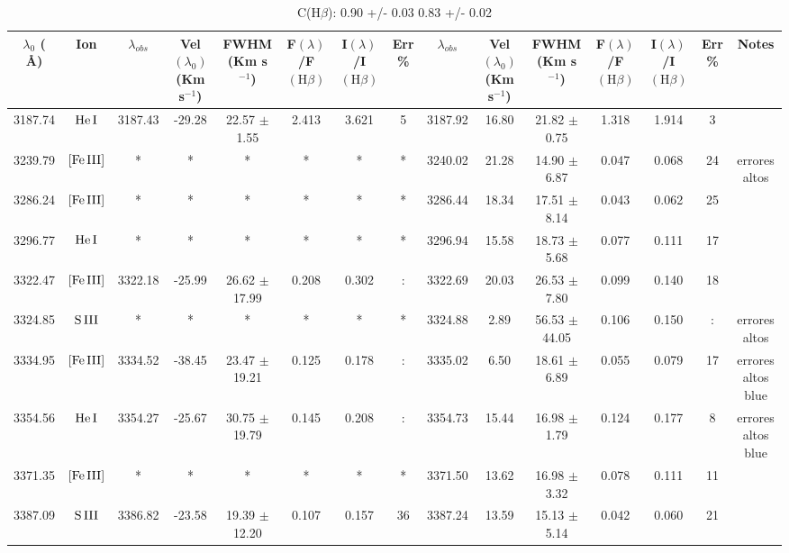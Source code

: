 \documentclass{article}
\begin{document}
\begin{table*}
\caption{C(H$\beta$): 0.90 +/- 0.03 0.83 +/- 0.02 } 
\begin{adjustbox}{width=\textwidth}
\label{}
\begin{tabular}{ccccccccccccccc} 
\hline
$\lambda_0$ ( \AA ) & Ion & $\lambda_{obs}$ & Vel$\left( \lambda_0 \right)$ (Km s$^{-1}$) & FWHM (Km s$^{-1}$) & F$\left( \lambda \right)$/F$\left( \mbox{H}\beta \right)$ & I$\left( \lambda \right)$/I$\left( \mbox{H}\beta \right)$ & Err \% & $\lambda_{obs}$ & Vel$\left( \lambda_0 \right)$ (Km s$^{-1}$) & FWHM (Km s$^{-1}$) & F$\left( \lambda \right)$/F$\left( \mbox{H}\beta \right)$ & I$\left( \lambda \right)$/I$\left( \mbox{H}\beta \right)$ & Err \% & Notes \\
\hline
3187.74 & $\mbox{He}\thinspace \mbox{I}$ & 3187.43 & -29.28 & 22.57 $\pm$ 1.55 & 2.413 & 3.621 & 5 & 3187.92 & 16.80 & 21.82 $\pm$ 0.75 & 1.318 & 1.914 & 3 &  \\
3239.79 & $\mbox{[Fe}\thinspace \mbox{III]}$ & * & * & * & * & * & * & 3240.02 & 21.28 & 14.90 $\pm$ 6.87 & 0.047 & 0.068 & 24 &  errores altos \\
3286.24 & $\mbox{[Fe}\thinspace \mbox{III]}$ & * & * & * & * & * & * & 3286.44 & 18.34 & 17.51 $\pm$ 8.14 & 0.043 & 0.062 & 25 &  \\
3296.77 & $\mbox{He}\thinspace \mbox{I}$ & * & * & * & * & * & * & 3296.94 & 15.58 & 18.73 $\pm$ 5.68 & 0.077 & 0.111 & 17 &  \\
3322.47 & $\mbox{[Fe}\thinspace \mbox{III]}$ & 3322.18 & -25.99 & 26.62 $\pm$ 17.99 & 0.208 & 0.302 & : & 3322.69 & 20.03 & 26.53 $\pm$ 7.80 & 0.099 & 0.140 & 18 &  \\
3324.85 & $\mbox{S}\thinspace \mbox{III}$ & * & * & * & * & * & * & 3324.88 & 2.89 & 56.53 $\pm$ 44.05 & 0.106 & 0.150 & : &  errores altos \\
3334.95 & $\mbox{[Fe}\thinspace \mbox{III]}$ & 3334.52 & -38.45 & 23.47 $\pm$ 19.21 & 0.125 & 0.178 & : & 3335.02 & 6.50 & 18.61 $\pm$ 6.89 & 0.055 & 0.079 & 17 &  errores altos blue \\
3354.56 & $\mbox{He}\thinspace \mbox{I}$ & 3354.27 & -25.67 & 30.75 $\pm$ 19.79 & 0.145 & 0.208 & : & 3354.73 & 15.44 & 16.98 $\pm$ 1.79 & 0.124 & 0.177 & 8 &  errores altos blue \\
3371.35 & $\mbox{[Fe}\thinspace \mbox{III]}$ & * & * & * & * & * & * & 3371.50 & 13.62 & 16.98 $\pm$ 3.32 & 0.078 & 0.111 & 11 &  \\
3387.09 & $\mbox{S}\thinspace \mbox{III}$ & 3386.82 & -23.58 & 19.39 $\pm$ 12.20 & 0.107 & 0.157 & 36 & 3387.24 & 13.59 & 15.13 $\pm$ 5.14 & 0.042 & 0.060 & 21 &  \\

\end{tabular}
\end{adjustbox}
\end{table*}
\end{document}

